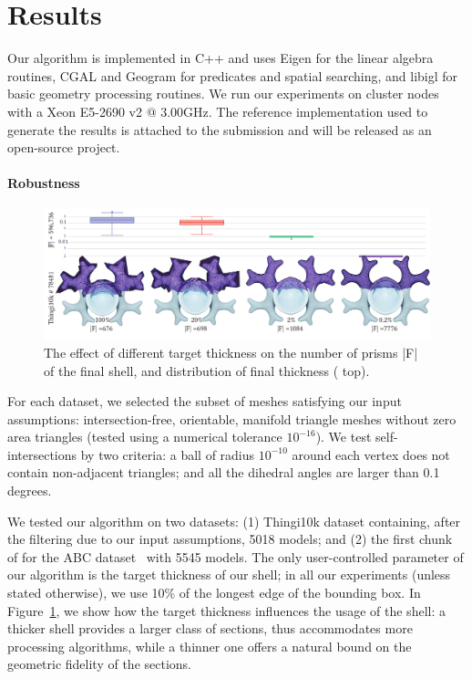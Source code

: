 \section{Results}
\label{sec:results}
Our algorithm is implemented in C++ and uses Eigen \cite{eigenweb} for the linear algebra routines, CGAL  and Geogram \cite{levy2015geogram} for predicates and spatial searching, and libigl \cite{jacobson2016libigl} for basic geometry processing routines.
We run our experiments on cluster nodes with a Xeon E5-2690 v2 @ 3.00GHz.
The reference implementation used to generate the results is attached to the submission and will be released as an open-source project.

\paragraph{Robustness}

\begin{figure}
    \centering
    \includegraphics[width=\linewidth,draft=false]{prism-tex/figs/varying_thickness}
    \caption{The effect of different target thickness on the number of prisms |F| of the final shell, 
    and distribution of final thickness ( top).} 
    
    \label{prism:fig:vary_thick}
\end{figure}

For each dataset, we selected the subset of meshes satisfying our input assumptions:  intersection-free, orientable, manifold triangle meshes without zero area triangles (tested using a numerical tolerance $10^{-16}$).  We test self-intersections by two criteria: a ball of radius $10^{-10}$ around each vertex does not contain non-adjacent triangles; and all the dihedral angles are larger than 0.1 degrees.

We tested our algorithm on two datasets: (1) Thingi10k dataset \cite{zhou2016thingi10k} containing, after the filtering due to our input assumptions, 5018 models; and (2) the first chunk of for the ABC dataset~\cite{Koch_2019_CVPR} with 5545 models.
The only user-controlled parameter of our algorithm is the target thickness of our shell; in all our experiments (unless stated otherwise), we use 10\% of the longest edge of the bounding box. 
In Figure~\ref{prism:fig:vary_thick}, we show how the target thickness influences the usage of the shell: a thicker shell provides a larger class of sections, thus accommodates more processing algorithms, while a thinner one offers a natural bound on the geometric fidelity of the sections.

